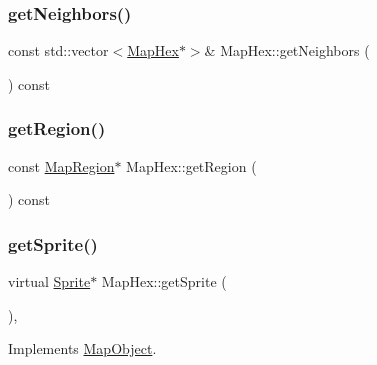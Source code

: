 \mbox{\label{class_map_hex_a59e8590a536b9e25c22ca6159e6e5243}} 
\subsubsection{\texorpdfstring{get\+Neighbors()}{getNeighbors()}}
{\footnotesize\ttfamily const std\+::vector$<$\hyperlink{class_map_hex}{Map\+Hex}$\ast$$>$\& Map\+Hex\+::get\+Neighbors (\begin{DoxyParamCaption}{ }\end{DoxyParamCaption}) const\hspace{0.3cm}{\ttfamily [inline]}}

\mbox{\label{class_map_hex_a0132642caf49e702635e990b1dc88bbf}} 
\subsubsection{\texorpdfstring{get\+Region()}{getRegion()}}
{\footnotesize\ttfamily const \hyperlink{class_map_region}{Map\+Region}$\ast$ Map\+Hex\+::get\+Region (\begin{DoxyParamCaption}{ }\end{DoxyParamCaption}) const\hspace{0.3cm}{\ttfamily [inline]}}

\mbox{\label{class_map_hex_ac4ff66c1341e7b572fd90e8f0117ec68}} 
\subsubsection{\texorpdfstring{get\+Sprite()}{getSprite()}}
{\footnotesize\ttfamily virtual \hyperlink{class_sprite}{Sprite}$\ast$ Map\+Hex\+::get\+Sprite (\begin{DoxyParamCaption}{ }\end{DoxyParamCaption})\hspace{0.3cm}{\ttfamily [inline]}, {\ttfamily [virtual]}}



Implements \hyperlink{class_map_object_a3881fea264291ba07e0172d1cd3246cc}{Map\+Object}.

